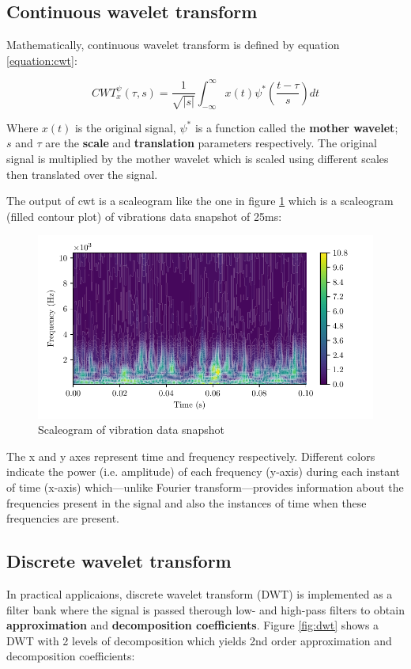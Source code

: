 \subsection{Continuous wavelet transform}
Mathematically, continuous wavelet transform is defined by equation \ref{equation:cwt}:

\begin{equation}
    CWT_x^\psi(\tau, s)=\frac{1}{\sqrt{|s|}}\int_{-\infty}^{\infty}x(t)\psi^* \left(\frac{t-\tau}{s}\right)dt
    \label{equation:cwt}
\end{equation}

Where $x(t)$ is the original signal, $\psi^*$ is a function called the \textbf{mother wavelet}; $s$ and $\tau$ are the \textbf{scale} and \textbf{translation} parameters respectively. The original signal is multiplied by the mother wavelet which is scaled using different scales then translated over the signal.

The output of \acrshort{cwt} is a scaleogram like the one in figure \ref{fig:scaleogram} which is a scaleogram (filled contour plot) of vibrations data snapshot of 25ms:

\begin{figure}[H]
    \centering
    \includegraphics{figures/scaleogram.pdf}
    \caption{Scaleogram of vibration data snapshot}
    \label{fig:scaleogram}
\end{figure}

The x and y axes represent time and frequency respectively. Different colors indicate the power (i.e. amplitude) of each frequency (y-axis) during each instant of time (x-axis) which—unlike Fourier transform—provides information about the frequencies present in the signal and also the instances of time when these frequencies are present.

\subsection{Discrete wavelet transform}
In practical applicaions, discrete wavelet transform (DWT) is implemented as a filter bank where the signal is passed therough low- and high-pass filters to obtain \textbf{approximation} and \textbf{decomposition coefficients}. Figure \ref{fig:dwt} shows a DWT with 2 levels of decomposition which yields 2nd order approximation and decomposition coefficients:

